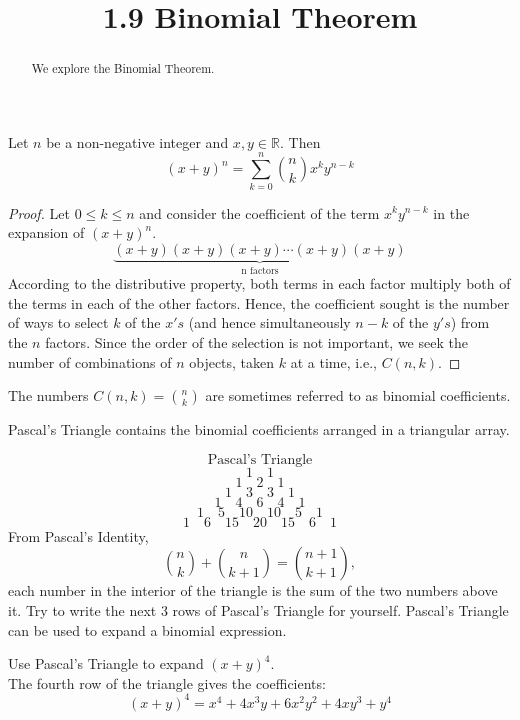 \documentclass[handout]{ximera}
\title{1.9 Binomial Theorem}
\begin{document}
\begin{abstract}
We explore the Binomial Theorem.
\end{abstract}

\maketitle




\begin{theorem}
Let $n$ be a non-negative integer and $x, y \in \mathbb{R}$. Then
\[
(x+y)^n = \sum_{k=0}^n \binom{n}{k} x^ky^{n-k}
\]
\end{theorem}

\begin{proof}
Let $0 \leq k \leq n$ and consider the coefficient of the term $x^ky^{n-k}$ in the expansion of $(x+y)^n$.
\[
\underbrace{(x+y) (x+y) (x+y) \cdots (x+y) (x+y)}_{\mbox{n factors}}
\]
According to the distributive property, both terms in each factor multiply both of the terms in each of the other factors.
Hence, the coefficient sought is the number of ways to select $k$ of the $x's$ 
(and hence simultaneously $n-k$ of the $y's$) from the $n$ factors. 
Since the order of the selection is not important, we seek the number of combinations of $n$ objects, 
taken $k$ at a time, i.e., $C(n, k)$. 
\end{proof}

\begin{remark}
The numbers $C(n,k) = \binom{n}{k}$ are sometimes referred to as binomial coefficients.
\end{remark}

Pascal's Triangle contains the binomial coefficients arranged in a triangular array.

\[
\mbox{Pascal's Triangle}
\]
\[
1 \quad 1
\]
\[
1\quad 2 \quad1
\]
\[
1\quad 3 \quad 3 \quad 1 
\]
\[
1\quad 4\quad 6\quad 4\quad 1
\]
\[
1\quad 5\quad 10\quad 10\quad 5\quad 1 
\]
\[
1\quad 6 \quad 15 \quad 20 \quad 15\quad 6 \quad 1
\]
From Pascal's Identity,
\[
\binom{n}{k} + \binom{n}{k+1} = \binom{n+1}{k+1},
\]
each number in the interior of the triangle is the sum of the two numbers above it.
Try to write the next 3 rows of Pascal's Triangle for yourself.
Pascal's Triangle can be used to expand a  binomial expression.

\begin{example}[example 1]
Use Pascal's Triangle to expand $(x+y)^4$.\\
The fourth row of the triangle gives the coefficients:
\[
(x+y)^4 = x^4 + 4x^3y + 6x^2y^2 + 4xy^3 + y^4
\]
\end{example}
\end{document}
